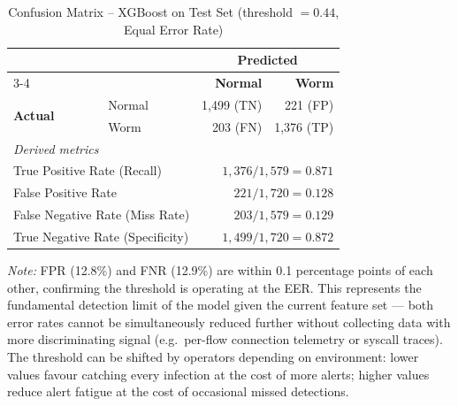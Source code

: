 \begin{table}[ht]
\centering
\caption{Confusion Matrix -- XGBoost on Test Set (threshold $= 0.44$, Equal Error Rate)}
\label{tab:confusion_matrix}
\begin{tabular}{llrr}
\toprule
 & & \multicolumn{2}{c}{\textbf{Predicted}} \\
\cmidrule(lr){3-4}
 & & \textbf{Normal} & \textbf{Worm} \\
\midrule
\multirow{2}{*}{\textbf{Actual}}
  & Normal & 1{,}499 (TN) & 221 (FP) \\
  & Worm   & 203 (FN)     & 1{,}376 (TP) \\
\midrule
\multicolumn{4}{l}{\textit{Derived metrics}} \\
\midrule
\multicolumn{2}{l}{True Positive Rate (Recall)}     & \multicolumn{2}{r}{$1{,}376 / 1{,}579 = 0.871$} \\
\multicolumn{2}{l}{False Positive Rate}              & \multicolumn{2}{r}{$221 / 1{,}720 = 0.128$} \\
\multicolumn{2}{l}{False Negative Rate (Miss Rate)}  & \multicolumn{2}{r}{$203 / 1{,}579 = 0.129$} \\
\multicolumn{2}{l}{True Negative Rate (Specificity)} & \multicolumn{2}{r}{$1{,}499 / 1{,}720 = 0.872$} \\
\bottomrule
\end{tabular}
\begin{minipage}{\linewidth}
\vspace{4pt}
\small
\textit{Note:} FPR (12.8\%) and FNR (12.9\%) are within 0.1 percentage points of each
other, confirming the threshold is operating at the EER. This represents the
fundamental detection limit of the model given the current feature set — both error
rates cannot be simultaneously reduced further without collecting data with more
discriminating signal (e.g.\ per-flow connection telemetry or syscall traces).
The threshold can be shifted by operators depending on environment: lower values
favour catching every infection at the cost of more alerts; higher values reduce
alert fatigue at the cost of occasional missed detections.
\end{minipage}
\end{table}


